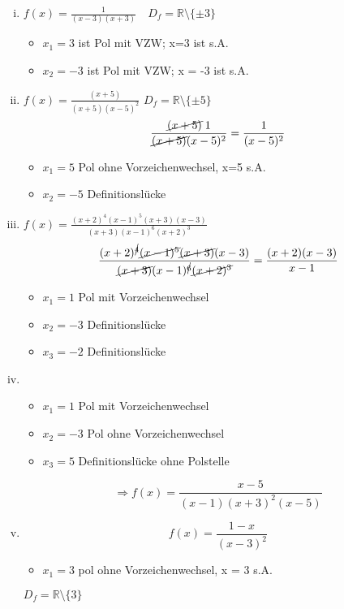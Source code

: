 \documentclass{book}
\begin{document}
\begin{enumerate}[i)]
    \item $f(x) = \frac 1{(x-3)(x+3)} \quad D_f = \mathbb{R}\setminus \{\pm 3\}$
        \begin{itemize}
            \item $x_1 = 3$ ist Pol mit VZW; x=3 ist s.A.
            \item $x_2 = -3$ ist Pol mit VZW; x = -3 ist s.A.
        \end{itemize}
    \item $f(x) = \frac {(x+5)}{(x+5)(x-5)^2}$ $D_f = \mathbb{R} \setminus \{\pm5\}$
    \[\frac{\cancel{(x+5)}\;1}{\cancel{(x+5)}(x-5)^2} = \frac 1{(x-5)^2}\]
            \begin{itemize}
                \item $x_1 = 5$ Pol ohne Vorzeichenwechsel, x=5 s.A.
                \item $x_2 = -5$ Definitionslücke
            \end{itemize}
    \item $f(x) = \frac {(x+2)^4(x-1)^5(x+3)(x-3)}{(x+3)(x-1)^6(x+2)^3}$
        \[ \frac {(x+2)^{\cancel{4}}\cancel{(x-1)^5}\cancel{(x+3)}(x-3)}{\cancel{(x+3)}(x-1)^{\cancel{6}} \cancel{(x+2)^3}} = \frac {(x+2)(x-3)}{x-1}\]
        \begin{itemize}
            \item $x_1 = 1$ Pol mit Vorzeichenwechsel
            \item $x_2 = -3$ Definitionslücke
            \item $x_3 = -2$ Definitionslücke
        \end{itemize}
        \hfill
    \item 
        \begin{itemize}
            \item $x_1 = 1$ Pol mit Vorzeichenwechsel
            \item $x_2 = -3$ Pol ohne Vorzeichenwechsel
            \item $x_3 = 5$ Definitionslücke ohne Polstelle
        \end{itemize}
        \[\Rightarrow f(x) = \frac {x-5}{(x-1)(x+3)^2(x-5)}\]
    \item \[f(x) = \frac {1-x}{(x-3)^2}\]
        \begin{itemize}
            \item $x_1 = 3$ pol ohne Vorzeichenwechsel, x = 3 s.A.

        \end{itemize}
        $D_f = \mathbb{R} \setminus \{3\}$


\end{enumerate}
\end{document}
